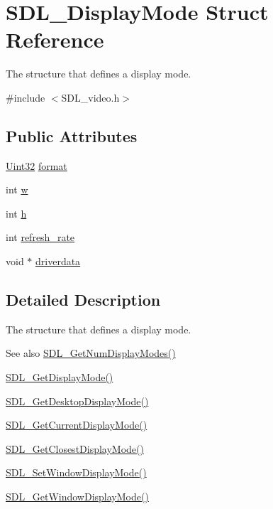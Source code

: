 \hypertarget{struct_s_d_l___display_mode}{}\section{S\+D\+L\+\_\+\+Display\+Mode Struct Reference}
\label{struct_s_d_l___display_mode}


The structure that defines a display mode.  




{\ttfamily \#include $<$S\+D\+L\+\_\+video.\+h$>$}

\subsection*{Public Attributes}
\begin{DoxyCompactItemize}
\item 
\hyperlink{_s_d_l__stdinc_8h_add440eff171ea5f55cb00c4a9ab8672d}{Uint32} \hyperlink{struct_s_d_l___display_mode_ae8120e0a18a99992f039756e1b503680}{format}
\item 
int \hyperlink{struct_s_d_l___display_mode_a504bb5e21950b719a0df43be51199046}{w}
\item 
int \hyperlink{struct_s_d_l___display_mode_a0d9eabed50a560ed553af772c26632d7}{h}
\item 
int \hyperlink{struct_s_d_l___display_mode_ad1b5783c9b292ebf24ad4e0e7a98e540}{refresh\+\_\+rate}
\item 
void $\ast$ \hyperlink{struct_s_d_l___display_mode_a411f93025411da873f37a384ae62bbcf}{driverdata}
\end{DoxyCompactItemize}


\subsection{Detailed Description}
The structure that defines a display mode. 

\begin{DoxySeeAlso}{See also}
\hyperlink{_s_d_l__video_8h_a5abcf18592f00019c517e791f8ba53fc}{S\+D\+L\+\_\+\+Get\+Num\+Display\+Modes()} 

\hyperlink{_s_d_l__video_8h_a0a53e003ec6ad24dd2bbbcd0ad297311}{S\+D\+L\+\_\+\+Get\+Display\+Mode()} 

\hyperlink{_s_d_l__video_8h_ab97bca68fc068a6ecc3db473c4c0defd}{S\+D\+L\+\_\+\+Get\+Desktop\+Display\+Mode()} 

\hyperlink{_s_d_l__video_8h_a14dce1cb33085b36f08d27b3d8f2335b}{S\+D\+L\+\_\+\+Get\+Current\+Display\+Mode()} 

\hyperlink{_s_d_l__video_8h_a794be92ee0a9efca226fa19a635fa470}{S\+D\+L\+\_\+\+Get\+Closest\+Display\+Mode()} 

\hyperlink{_s_d_l__video_8h_a2ca17d1e857d1560738e002c9935088a}{S\+D\+L\+\_\+\+Set\+Window\+Display\+Mode()} 

\hyperlink{_s_d_l__video_8h_a8185547bc7cb0bbeb400f459792d081a}{S\+D\+L\+\_\+\+Get\+Window\+Display\+Mode()} 
\end{DoxySeeAlso}



